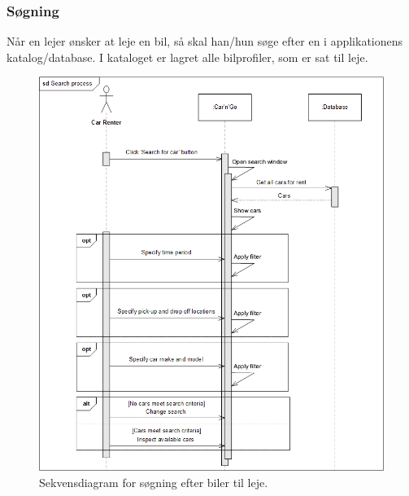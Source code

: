 \documentclass[Rapport/Rapport_main.tex]{subfiles}
\begin{document}
\subsubsection{Søgning}
Når en lejer ønsker at leje en bil, så skal han/hun søge efter en i applikationens katalog/database. I kataloget er lagret alle bilprofiler, som er sat til leje. 
\begin{figure}[H]
    \centering
    \includegraphics[width=1\textwidth]{Arkitektur/Softwarearkitektur/Searching/graphics/Search_Process_SD.png}
    \caption{Sekvensdiagram for søgning efter biler til leje. }
    \label{fig:SearchProcessSD}
\end{figure}
\end{document}
